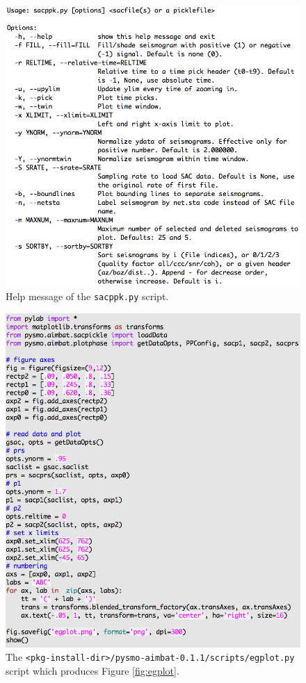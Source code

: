 \documentclass[12pt, titlepage]{article}
\begin{document}
\begin{figure}[!h]
    \centering
    \vspace{1em}
    \includegraphics[width = 0.94 \textwidth]{figs/help-sacppk.png}
    \caption{Help message of the \texttt{sacppk.py} script. }
    \label{fig:help-sacppk}
\end{figure}



\begin{figure}[!h!b]
    \centering
    \includegraphics[width = 0.94 \textwidth]{figs/prog-egplot.png}
    \caption{The \texttt{<pkg-install-dir>/pysmo-aimbat-0.1.1/scripts/egplot.py} script which produces Figure \ref{fig:egplot}. }
    \label{fig:prog-egplot}
\end{figure}
\end{document}
